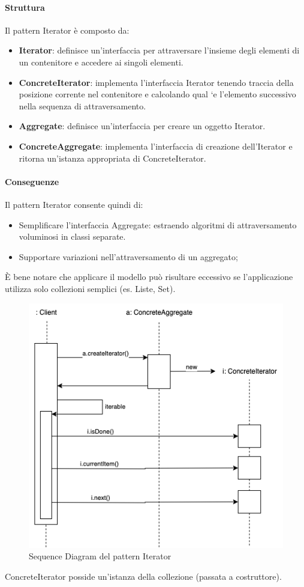 \paragraph{Struttura} Il pattern Iterator è composto da:
\begin{itemize}
    \item \textbf{Iterator}: definisce un’interfaccia per attraversare l’insieme degli elementi di un contenitore e accedere ai singoli elementi.
    \item \textbf{ConcreteIterator}: implementa l’interfaccia Iterator tenendo traccia della posizione corrente nel contenitore e calcolando qual `e l’elemento successivo nella sequenza di attraversamento.
    \item \textbf{Aggregate}: definisce un’interfaccia per creare un oggetto Iterator.
    \item \textbf{ConcreteAggregate}: implementa l’interfaccia di creazione dell’Iterator e ritorna un’istanza appropriata di ConcreteIterator.
\end{itemize}

\paragraph{Conseguenze} Il pattern Iterator consente quindi di:
\begin{itemize}
    \item Semplificare l'interfaccia Aggregate: estraendo algoritmi di attraversamento voluminosi in classi separate.
    \item Supportare variazioni nell'attraversamento di un aggregato;
\end{itemize}

È bene notare che applicare il modello può risultare eccessivo se l'applicazione utilizza solo collezioni semplici (es. Liste, Set).

\begin{figure}[H]
    \centering
    \includegraphics[width=0.75\linewidth]{assets/pattern/iterator/iterator-sequence.drawio.png}
    \caption{Sequence Diagram del pattern Iterator}
\end{figure}

ConcreteIterator posside un'istanza della collezione (passata a costruttore).

\newpage
